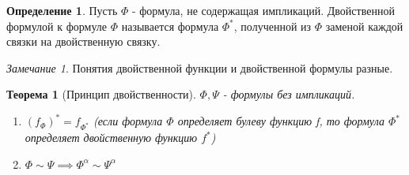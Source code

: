 \documentclass[a4paper]{article}
\newtheorem{theorem}{Теорема}[section]
\theoremstyle{definition}
\newtheorem*{definition}{Определение}
\theoremstyle{remark}
\newtheorem*{remark}{Замечание}
\begin{document}
    \begin{definition}
        Пусть $\Phi$ - формула, не содержащая импликаций.
        Двойственной формулой к формуле $\Phi$ называется формула $\Phi^*$,
        полученной из $\Phi$ заменой каждой связки на двойственную связку.
    \end{definition}
    \begin{remark}
        Понятия двойственной функции и двойственной
        формулы разные.
    \end{remark}
    \begin{theorem}[Принцип двойственности]
        $\Phi, \Psi$ - формулы без импликаций.
        \begin{enumerate}
            \item $(f_\Phi)^* = f_{\Phi^*}$ (если формула $\Phi$ определяет булеву функцию f, то формула $\Phi^*$ определяет двойственную функцию $f^*$)
            \item $\Phi\sim\Psi\implies\Phi^\alpha\sim\Psi^\alpha$
        \end{enumerate}
    \end{theorem}
\end{document}
